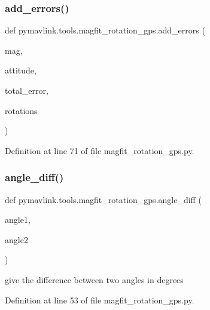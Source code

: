\subsubsection{\texorpdfstring{add\_errors()}{add\_errors()}}
{\footnotesize\ttfamily def pymavlink.\+tools.\+magfit\+\_\+rotation\+\_\+gps.\+add\+\_\+errors (\begin{DoxyParamCaption}\item[{}]{mag,  }\item[{}]{attitude,  }\item[{}]{total\+\_\+error,  }\item[{}]{rotations }\end{DoxyParamCaption})}



Definition at line 71 of file magfit\+\_\+rotation\+\_\+gps.\+py.

\mbox{\label{namespacepymavlink_1_1tools_1_1magfit__rotation__gps_a497516bc1636ac24a1df1d8d08440dab}} 
\subsubsection{\texorpdfstring{angle\_diff()}{angle\_diff()}}
{\footnotesize\ttfamily def pymavlink.\+tools.\+magfit\+\_\+rotation\+\_\+gps.\+angle\+\_\+diff (\begin{DoxyParamCaption}\item[{}]{angle1,  }\item[{}]{angle2 }\end{DoxyParamCaption})}

\begin{DoxyVerb}give the difference between two angles in degrees\end{DoxyVerb}
 

Definition at line 53 of file magfit\+\_\+rotation\+\_\+gps.\+py.

\mbox{\label{namespacepymavlink_1_1tools_1_1magfit__rotation__gps_acb9dbe90061d5435cea646ad6dfa6a75}} 
